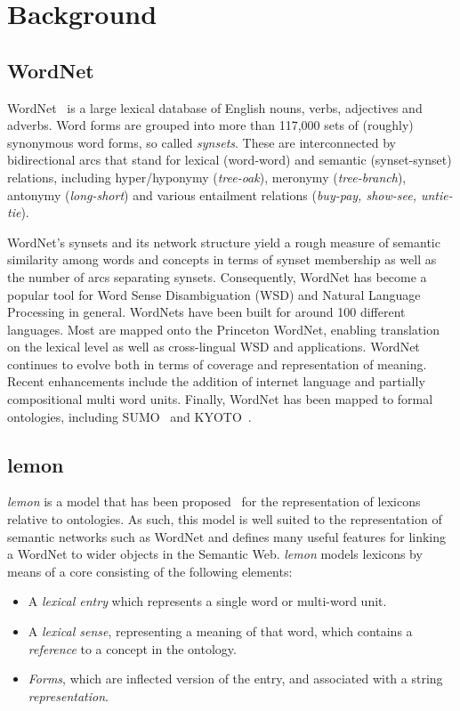 \documentclass[10pt, a4paper]{article}
\newcommand{\lemon}[0]{\emph{lemon}}
\begin{document}
\section{Background}

\subsection{WordNet}

WordNet~\cite{miller1995wordnet,fellbaum1998wordnet,fellbaum2010wordnet} is a large lexical database of English nouns,
verbs, adjectives and adverbs. Word forms are grouped into more than 117,000 sets of
(roughly) synonymous word forms, so called \emph{synsets}. These are interconnected by bidirectional
arcs that stand for lexical (word-word) and semantic (synset-synset) relations, including
hyper/hyponymy (\emph{tree-oak}), meronymy (\emph{tree-branch}), antonymy
(\emph{long-short}) and various entailment relations (\emph{buy-pay, show-see, untie-
tie}).

WordNet's synsets and its network structure yield a rough measure of semantic similarity
among words and concepts in terms of synset membership as well as the number of arcs
separating synsets. Consequently, WordNet has become a popular tool for Word Sense
Disambiguation (WSD) and Natural Language Processing in general. WordNets have
been built for around 100 different languages. Most are mapped onto the Princeton
WordNet, enabling translation on the lexical level as well as cross-lingual WSD and
applications. WordNet continues to evolve both in terms of coverage and representation
of meaning. Recent enhancements include the addition of internet language and partially
compositional multi word units. Finally, WordNet has been mapped to formal ontologies, 
including SUMO~\cite{niles2003mapping} and KYOTO~\cite{vossen2014kyoto}.

\subsection{lemon}

\lemon{} is a model that has been proposed~\cite{mccrae2012interchanging} for the representation of
lexicons relative to ontologies. As such, this model is well suited to the
representation of semantic networks such as WordNet and defines many useful
features for linking a WordNet to wider objects in the Semantic Web. \lemon{}
models lexicons by means of a core consisting of the following elements:

\begin{itemize}
  \item A \emph{lexical entry} which represents a single word or multi-word
    unit.
  \item A \emph{lexical sense}, representing a meaning of that word, which
    contains a \emph{reference} to a concept in the ontology.
  \item \emph{Forms}, which are inflected version of the entry, and associated
    with a string \emph{representation}.
\end{itemize}
\end{document}
